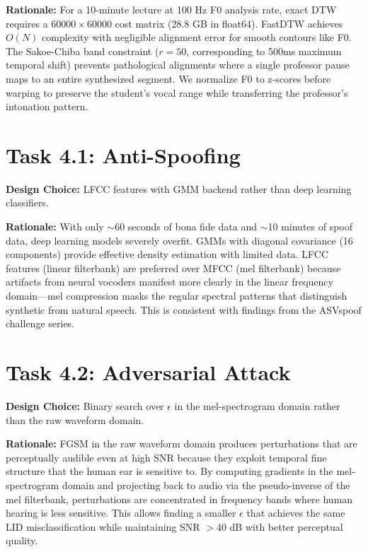 \documentclass[11pt]{article}
\begin{document}
\textbf{Rationale:} For a 10-minute lecture at 100 Hz F0 analysis rate, exact DTW requires a $60000 \times 60000$ cost matrix (28.8 GB in float64). FastDTW achieves $O(N)$ complexity with negligible alignment error for smooth contours like F0. The Sakoe-Chiba band constraint ($r=50$, corresponding to 500ms maximum temporal shift) prevents pathological alignments where a single professor pause maps to an entire synthesized segment. We normalize F0 to z-scores before warping to preserve the student's vocal range while transferring the professor's intonation pattern.

\section*{Task 4.1: Anti-Spoofing}
\textbf{Design Choice:} LFCC features with GMM backend rather than deep learning classifiers.

\textbf{Rationale:} With only $\sim$60 seconds of bona fide data and $\sim$10 minutes of spoof data, deep learning models severely overfit. GMMs with diagonal covariance (16 components) provide effective density estimation with limited data. LFCC features (linear filterbank) are preferred over MFCC (mel filterbank) because artifacts from neural vocoders manifest more clearly in the linear frequency domain---mel compression masks the regular spectral patterns that distinguish synthetic from natural speech. This is consistent with findings from the ASVspoof challenge series.

\section*{Task 4.2: Adversarial Attack}
\textbf{Design Choice:} Binary search over $\epsilon$ in the mel-spectrogram domain rather than the raw waveform domain.

\textbf{Rationale:} FGSM in the raw waveform domain produces perturbations that are perceptually audible even at high SNR because they exploit temporal fine structure that the human ear is sensitive to. By computing gradients in the mel-spectrogram domain and projecting back to audio via the pseudo-inverse of the mel filterbank, perturbations are concentrated in frequency bands where human hearing is less sensitive. This allows finding a smaller $\epsilon$ that achieves the same LID misclassification while maintaining SNR $> 40$ dB with better perceptual quality.
\end{document}

